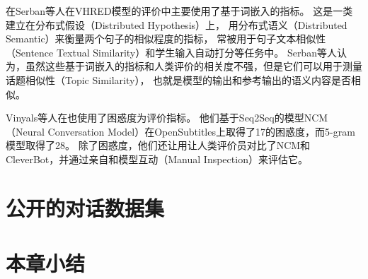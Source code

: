 在Serban等人在VHRED模型的评价中主要使用了基于词嵌入的指标。
这是一类建立在分布式假设（Distributed Hypothesis）上，
用分布式语义（Distributed Semantic）来衡量两个句子的相似程度的指标，
常被用于句子文本相似性（Sentence Textual Similarity）和学生输入自动打分等任务中。
Serban等人认为，虽然这些基于词嵌入的指标和人类评价的相关度不强，但是它们可以用于测量话题相似性（Topic Similarity），
也就是模型的输出和参考输出的语义内容是否相似。

Vinyals等人在\cite{GoogleChatbot}也使用了困惑度为评价指标。
他们基于Seq2Seq的模型NCM（Neural Conversation Model）在OpenSubtitles上取得了17的困惑度，而5-gram模型取得了28。
除了困惑度，他们还让用让人类评价员对比了NCM和CleverBot，并通过亲自和模型互动（Manual Inspection）来评估它。



\section{公开的对话数据集}\label{sec:public_dataset}

\section{本章小结}\label{sec:rw_conclusion}
